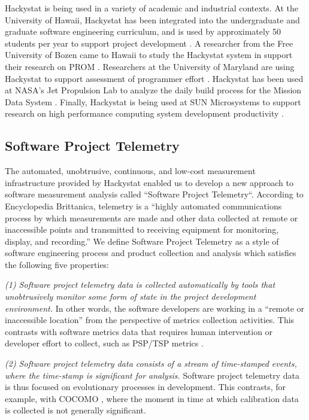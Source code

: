 Hackystat is being used in a variety of academic and industrial contexts.
At the University of Hawaii, Hackystat has been  integrated into the
undergraduate and graduate software engineering curriculum, and is
used by approximately 50 students per year to support project
development \cite{csdl2-03-12}.  A researcher from the Free University of
Bozen came to Hawaii to study the Hackystat system in support their research on
PROM \cite{Sillitti03}.  Researchers at the University of Maryland are
using Hackystat to support assessment of programmer effort
\cite{Hochstein05}.  Hackystat has been used at NASA's Jet Propulsion
Lab to analyze the daily build process for the Mission Data System
\cite{csdl2-03-07}.  Finally, Hackystat is being used at SUN Microsystems
to support research on high performance computing system development
productivity \cite{csdl2-04-03}.

\subsection {Software Project Telemetry}
\label{sec:telemetry}

The automated, unobtrusive, continuous, and low-cost measurement
infrastructure provided by Hackystat enabled us to develop a new approach
to software measurement analysis called ``Software Project Telemetry``. 
According to Encyclopedia Brittanica, telemetry is a ``highly automated
communications process by which measurements are made and other data
collected at remote or inaccessible points and transmitted to receiving
equipment for monitoring, display, and recording.''  We
define Software Project Telemetry as a style of software engineering
process and product collection and analysis which satisfies the following
five properties:

{\em (1) Software project telemetry data is collected automatically by tools
that unobtrusively monitor some form of state in the project development
environment.}  In other words, the software developers are working in a
``remote or inaccessible location'' from the perspective of metrics
collection activities. This contrasts with software metrics data that
requires human intervention or developer effort to collect, such as PSP/TSP
metrics \cite{Humphrey95}.
        
{\em (2) Software project telemetry data consists of a stream of
time-stamped events, where the time-stamp is significant for analysis.}
Software project telemetry data is thus focused on evolutionary processes
in development.  This contrasts, for example, with COCOMO \cite{Boehm00},
where the moment in time at which calibration data is collected is not
generally significant.

